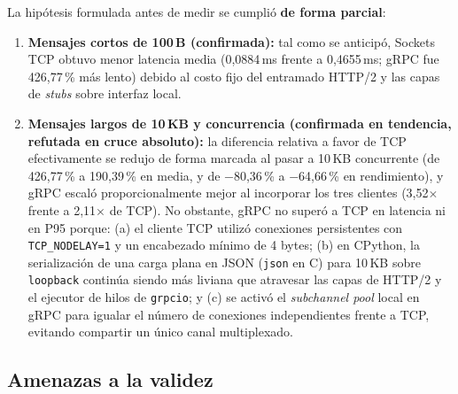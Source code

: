La hipótesis formulada antes de medir se cumplió \textbf{de forma parcial}:
\begin{enumerate}
  \item \textbf{Mensajes cortos de 100\,B (confirmada):} tal como se anticipó, Sockets TCP obtuvo menor latencia media (0,0884\,ms frente a 0,4655\,ms; gRPC fue 426,77\,\% más lento) debido al costo fijo del entramado HTTP/2 y las capas de \emph{stubs} sobre interfaz local.
  \item \textbf{Mensajes largos de 10\,KB y concurrencia (confirmada en tendencia, refutada en cruce absoluto):} la diferencia relativa a favor de TCP efectivamente se redujo de forma marcada al pasar a 10\,KB concurrente (de 426,77\,\% a 190,39\,\% en media, y de $-$80,36\,\% a $-$64,66\,\% en rendimiento), y gRPC escaló proporcionalmente mejor al incorporar los tres clientes (3,52$\times$ frente a 2,11$\times$ de TCP). No obstante, gRPC no superó a TCP en latencia ni en P95 porque: (a) el cliente TCP utilizó conexiones persistentes con \texttt{TCP\_NODELAY=1} y un encabezado mínimo de 4 bytes; (b) en CPython, la serialización de una carga plana en JSON (\texttt{json} en C) para 10\,KB sobre \texttt{loopback} continúa siendo más liviana que atravesar las capas de HTTP/2 y el ejecutor de hilos de \texttt{grpcio}; y (c) se activó el \emph{subchannel pool} local en gRPC para igualar el número de conexiones independientes frente a TCP, evitando compartir un único canal multiplexado.
\end{enumerate}

\subsection{Amenazas a la validez}


